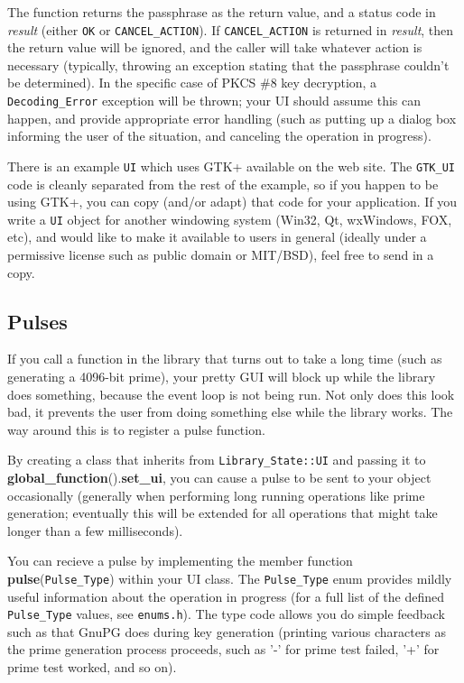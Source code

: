 \documentclass{article}
\newcommand{\filename}[1]{\texttt{#1}}
\newcommand{\function}[1]{\textbf{#1}}
\newcommand{\type}[1]{\texttt{#1}}
\renewcommand{\arg}[1]{\textsl{#1}}
\begin{document}
The function returns the passphrase as the return value, and a status code in
\arg{result} (either \type{OK} or \type{CANCEL\_ACTION}). If
\type{CANCEL\_ACTION} is returned in \arg{result}, then the return value will
be ignored, and the caller will take whatever action is necessary (typically,
throwing an exception stating that the passphrase couldn't be determined). In
the specific case of PKCS \#8 key decryption, a \type{Decoding\_Error}
exception will be thrown; your UI should assume this can happen, and provide
appropriate error handling (such as putting up a dialog box informing the user
of the situation, and canceling the operation in progress).

There is an example \type{UI} which uses GTK+ available on the web site. The
\type{GTK\_UI} code is cleanly separated from the rest of the example, so if
you happen to be using GTK+, you can copy (and/or adapt) that code for your
application. If you write a \type{UI} object for another windowing system
(Win32, Qt, wxWindows, FOX, etc), and would like to make it available to users
in general (ideally under a permissive license such as public domain or
MIT/BSD), feel free to send in a copy.

\subsection{Pulses}

If you call a function in the library that turns out to take a long time (such
as generating a 4096-bit prime), your pretty GUI will block up while the
library does something, because the event loop is not being run. Not only does
this look bad, it prevents the user from doing something else while the library
works. The way around this is to register a pulse function.

By creating a class that inherits from \type{Library\_State::UI} and
passing it to \function{global\_function}().\function{set\_ui}, you
can cause a pulse to be sent to your object occasionally (generally
when performing long running operations like prime generation;
eventually this will be extended for all operations that might take
longer than a few milliseconds).

You can recieve a pulse by implementing the member function
\function{pulse}(\type{Pulse\_Type}) within your UI class.  The
\type{Pulse\_Type} enum provides mildly useful information about the
operation in progress (for a full list of the defined
\type{Pulse\_Type} values, see \filename{enums.h}). The type code
allows you do simple feedback such as that GnuPG does during key
generation (printing various characters as the prime generation
process proceeds, such as '-' for prime test failed, '+' for prime
test worked, and so on).
\end{document}
